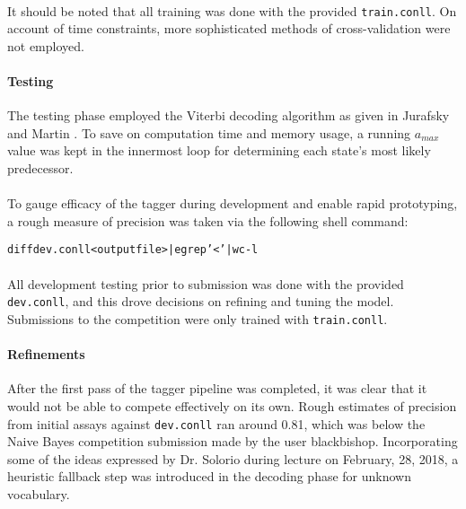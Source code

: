 \documentclass[11pt,a4paper]{article}
\begin{document}
\paragraph{}
It should be noted that all training was done with the provided \texttt{train.conll}.
On account of time constraints, more sophisticated methods of cross-validation \cite[86-87]{JurafskyMartin}
were not employed.

\paragraph{Testing}
The testing phase employed the Viterbi decoding algorithm as given in Jurafsky and
Martin . To save on computation time and memory usage,
a running $a_{max}$ value was kept in the innermost loop for determining each
state's most likely predecessor.

\paragraph{}
To gauge efficacy of the tagger during development and enable rapid prototyping,
a rough measure of precision was taken via the following shell command:

\begin{alltt}
  \tiny{diff dev.conll <output file> | egrep '<' | wc -l}
\end{alltt}

\paragraph{}
All development testing prior to submission was done with the provided
\texttt{dev.conll}, and this drove decisions on refining and tuning the model.
Submissions to the competition were only trained with \texttt{train.conll}.

\paragraph{Refinements}
After the first pass of the tagger pipeline was completed, it was clear that it would
not be able to compete effectively on its own. Rough estimates of precision from
initial assays against \texttt{dev.conll} ran around 0.81, which was below the
Naive Bayes competition submission made by the user blackbishop.
Incorporating some of the ideas expressed by Dr. Solorio during lecture on February, 28, 2018,
a heuristic fallback step was introduced in the decoding phase for unknown vocabulary.
\end{document}

